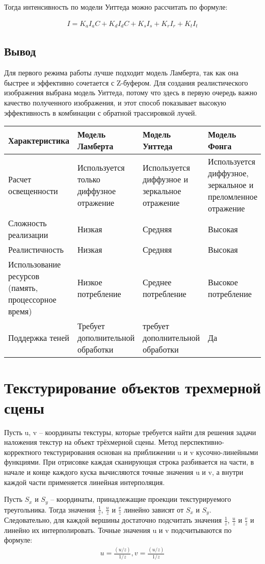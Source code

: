	Тогда интенсивность по модели Уиттеда можно рассчитать по формуле:
	
	\begin{align}
		I = K_a I_a C + K_d I_d C + K_s I_s + K_r I_r + K_t I_t
	\end{align}
	\subsection{Вывод}
	Для первого режима работы лучше подходит модель Ламберта, так как она быстрее и эффективно сочетается с Z-буфером. Для создания реалистического изображения выбрана модель Уиттеда, потому что здесь в первую очередь важно качество полученного изображения, и этот способ показывает высокую эффективность в комбинации с обратной трассировкой лучей.
	
	\begin{tabular}{|p{4cm}|p{4cm}|p{4cm}|p{4cm}|}
		\hline
		Характеристика & Модель Ламберта &  Модель Уиттеда & Модель Фонга \\
		\hline
		Расчет освещенности & Используется только диффузное отражение & Используется диффузное и зеркальное отражение & Используется диффузное, зеркальное и преломленное отражение \\
		\hline
		Сложность реализации & Низкая & Средняя & Высокая \\
		\hline
		Реалистичность & Низкая & Средняя & Высокая \\
		\hline
		Использование ресурсов (память, процессорное время) & Низкое потребление &  Среднее потребление & Высокое потребление \\
		\hline
		Поддержка теней & Требует дополнительной обработки & требует дополнительной обработки & Да \\
		\hline
	\end{tabular}
\section{Текстурирование объектов трехмерной сцены}
Пусть u, v – координаты текстуры, которые требуется найти для решения задачи наложения текстур на объект трёхмерной сцены. Метод перспективно-корректного текстурирования основан на приближении u и v кусочно-линейными функциями. При отрисовке каждая сканирующая строка разбивается на части, в начале и конце каждого куска вычисляются точные значения u и v, а внутри каждой части применяется линейная интерполяция.

Пусть $S_x$ и $S_y$ – координаты, принадлежащие проекции текстурируемого треугольника. Тогда значения $\frac{1}{z}$, $\frac{u}{z}$ и $\frac{v}{z}$ линейно зависят от $S_x$ и $S_y$. Следовательно, для каждой вершины достаточно подсчитать значения  $\frac{1}{z}$, $\frac{u}{z}$ и $\frac{v}{z}$ и линейно их интерполировать.
Точные значения u и v подсчитываются по формуле:
\begin{align}
	u = \frac{(u/z)}{1/z}, v = \frac{(u/z)}{1/z}
\end{align}
